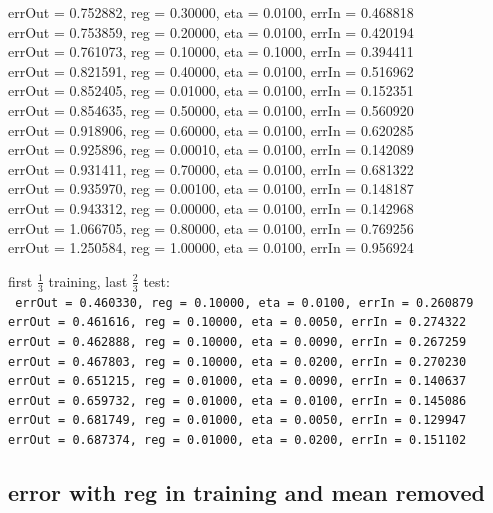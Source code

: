 \begin{appendices}
{  errOut = 0.752882, reg = 0.30000, eta = 0.0100, errIn = 0.468818 \\
  errOut = 0.753859, reg = 0.20000, eta = 0.0100, errIn = 0.420194 \\
  errOut = 0.761073, reg = 0.10000, eta = 0.1000, errIn = 0.394411 \\
  errOut = 0.821591, reg = 0.40000, eta = 0.0100, errIn = 0.516962 \\
  errOut = 0.852405, reg = 0.01000, eta = 0.0100, errIn = 0.152351 \\
  errOut = 0.854635, reg = 0.50000, eta = 0.0100, errIn = 0.560920 \\
  errOut = 0.918906, reg = 0.60000, eta = 0.0100, errIn = 0.620285 \\
  errOut = 0.925896, reg = 0.00010, eta = 0.0100, errIn = 0.142089 \\
  errOut = 0.931411, reg = 0.70000, eta = 0.0100, errIn = 0.681322 \\
  errOut = 0.935970, reg = 0.00100, eta = 0.0100, errIn = 0.148187 \\
  errOut = 0.943312, reg = 0.00000, eta = 0.0100, errIn = 0.142968 \\
  errOut = 1.066705, reg = 0.80000, eta = 0.0100, errIn = 0.769256 \\
  errOut = 1.250584, reg = 1.00000, eta = 0.0100, errIn = 0.956924 \\
}

\noindent first $\frac{1}{3}$ training, last $\frac{2}{3}$ test: \\
\texttt{
  errOut = 0.460330, reg = 0.10000, eta = 0.0100, errIn = 0.260879 \\
  errOut = 0.461616, reg = 0.10000, eta = 0.0050, errIn = 0.274322 \\
  errOut = 0.462888, reg = 0.10000, eta = 0.0090, errIn = 0.267259 \\
  errOut = 0.467803, reg = 0.10000, eta = 0.0200, errIn = 0.270230 \\
  errOut = 0.651215, reg = 0.01000, eta = 0.0090, errIn = 0.140637 \\
  errOut = 0.659732, reg = 0.01000, eta = 0.0100, errIn = 0.145086 \\
  errOut = 0.681749, reg = 0.01000, eta = 0.0050, errIn = 0.129947 \\
  errOut = 0.687374, reg = 0.01000, eta = 0.0200, errIn = 0.151102
}

\subsection{error with reg in training and mean removed}


\end{appendices}
